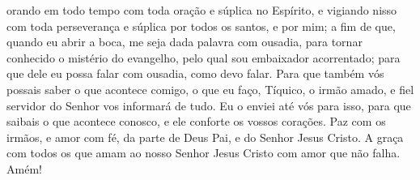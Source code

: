 {  orando em todo tempo com toda oração e súplica no Espírito, e vigiando nisso com toda perseverança e súplica por todos os santos,
  e por mim; a fim de que, quando eu abrir a boca, me seja dada palavra com ousadia, para tornar conhecido o mistério do evangelho,
  pelo qual sou embaixador acorrentado;
 para que dele eu possa falar com ousadia, como devo falar.
  Para que também vós possais saber o que acontece comigo,
{} o que eu faço, Tíquico, o irmão amado, e fiel servidor do Senhor vos informará de tudo.
  Eu o enviei até vós para isso, para que saibais o que acontece conosco, e ele conforte os vossos corações.
  Paz
{} com os irmãos, e amor com fé, da parte de Deus Pai, e do Senhor Jesus Cristo.
  A graça
{} com todos os que amam ao nosso Senhor Jesus Cristo com amor que não falha.
 Amém!{}
\par }

